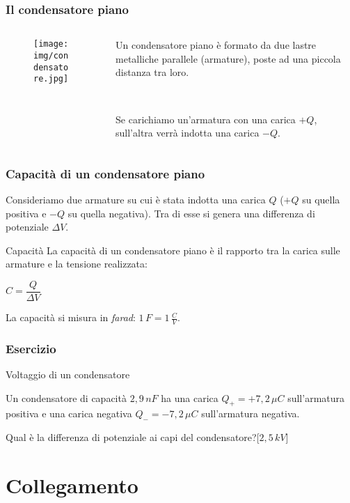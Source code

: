 \documentclass[]{beamer}
\theoremstyle{plain}
\begin{document}
\begin{frame}
\frametitle{Il condensatore piano}
\begin{columns}
\begin{column}{0.3\textwidth}
\begin{figure}
\texttt{[image: img/condensatore.jpg]}
\end{figure}
\end{column}
\begin{column}{0.7\textwidth}
Un condensatore piano è formato da due lastre metalliche parallele (armature), poste ad una piccola distanza tra loro.\pause

~

Se carichiamo un'armatura con una carica $ +Q $, sull'altra verrà indotta una carica $ -Q $.
\end{column}
\end{columns}
\end{frame}



\begin{frame}
\frametitle{Capacità di un condensatore piano}
Consideriamo due armature su cui è stata indotta una carica $ Q $ ($ +Q $ su quella positiva e $ -Q $ su quella negativa). Tra di esse si genera una differenza di potenziale $ \Delta V $.\pause
\begin{block}{Capacità}
La capacità di un condensatore piano è il rapporto tra la carica sulle armature e la tensione realizzata:
\begin{center}
\colorbox{marroncino!30}{$ C = \dfrac{Q}{\Delta V} $}
\end{center}
La capacità si misura in \emph{farad}: $ 1 \, F = 1 \, \frac{C}{V} $.
\end{block}
\end{frame}


\begin{frame}
\frametitle{Esercizio}
\begin{exampleblock}{Voltaggio di un condensatore}
  \small{
  Un condensatore di capacità $ 2,9 \, nF $ ha una carica $ Q_+ = + 7,2 \, \mu C $ sull'armatura positiva e una carica negativa $ Q_- = - 7,2 \, \mu C $ sull'armatura negativa.

  Qual è la differenza di potenziale ai capi del condensatore?\hspace*{\fill}[$ 2,5 \, kV $]}
\end{exampleblock}
\end{frame}


\section{Collegamento}
\end{document}
